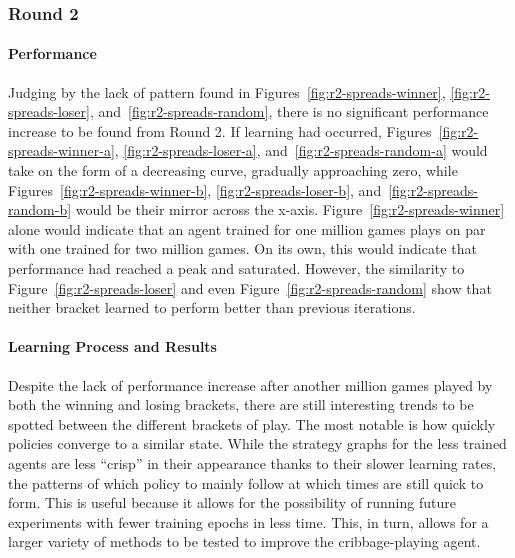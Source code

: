 
\subsubsection*{Round 2}
\label{sec:findings-r2}

\paragraph*{Performance}
\label{sec:findings-r2-perf}


Judging by the lack of pattern found in
Figures~\ref{fig:r2-spreads-winner},
\ref{fig:r2-spreads-loser},
and~\ref{fig:r2-spreads-random},
there is no significant performance increase to be found from Round 2.
%
If learning had occurred,
Figures~\ref{fig:r2-spreads-winner-a},
\ref{fig:r2-spreads-loser-a},
and~\ref{fig:r2-spreads-random-a}
would take on the form of a decreasing curve,
gradually approaching zero,
while Figures~\ref{fig:r2-spreads-winner-b},
\ref{fig:r2-spreads-loser-b},
and~\ref{fig:r2-spreads-random-b}
would be their mirror across the x-axis.
%
Figure~\ref{fig:r2-spreads-winner} alone
would indicate that an agent trained for one million games plays on par with
one trained for two million games.
%
On its own,
this would indicate that performance had reached a peak and saturated.
%
However,
the similarity to Figure~\ref{fig:r2-spreads-loser}
and even Figure~\ref{fig:r2-spreads-random}
show that neither bracket learned to perform better than previous iterations.









\paragraph*{Learning Process and Results}
\label{sec:findings-r2-results}




Despite the lack of performance increase after another million games played by
both the winning and losing brackets,
there are still interesting trends to be spotted between the different brackets
of play.
%
The most notable is how quickly policies converge to a similar state.
%
While the strategy graphs for the less trained agents are less ``crisp''
in their appearance thanks to their slower learning rates,
the patterns of which policy to mainly follow at which times
are still quick to form.
%
This is useful because it allows for the possibility of running future
experiments with fewer training epochs in less time.
%
This, in turn, allows for a larger variety of methods to be tested to improve
the cribbage-playing agent.

